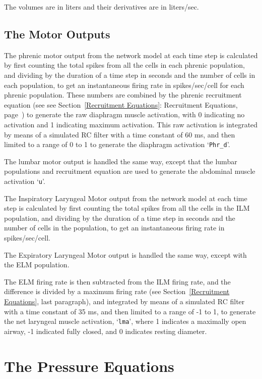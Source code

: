 \documentclass[12pt,openany,oneside]{book}
\newcommand{\tisamp}[1]{`\texttt{#1}'}
\newcommand{\tixref}[1]{see Section~\ref{#1}: #1, page~\pageref{#1}}
\begin{document}
The volumes are in liters and their derivatives are in liters/sec.

\subsection{The Motor Outputs}

\label{Phrd}
The phrenic motor output from the network model at each time step is
calculated by first counting the total spikes from all the cells in
each phrenic population, and dividing by the duration of a time step
in seconds and the number of cells in each population, to get an
instantaneous firing rate in spikes/sec/cell for each phrenic
population. These numbers are combined by the phrenic recruitment
equation (see \tixref{Recruitment Equations}) to generate the raw
diaphragm muscle activation, with 0 indicating no activation and 1
indicating maximum activation. This raw activation is integrated by
means of a simulated RC filter with a time constant of 60 ms, and then
limited to a range of 0 to 1 to generate the diaphragm activation
\tisamp{Phr\_d}.

The lumbar motor output is handled the same way, except that the
lumbar populations and recruitment equation are used to generate the
abdominal muscle activation \tisamp{u}.

The Inspiratory Laryngeal Motor output from the network model at each
time step is calculated by first counting the total spikes from all
the cells in the ILM population, and dividing by the duration of
a time step in seconds and the number of cells in the population, to
get an instantaneous firing rate in spikes/sec/cell.

The Expiratory Laryngeal Motor output is handled the same way, except
with the ELM population.

The ELM firing rate is then subtracted from the ILM firing rate, and
the difference is divided by a maximum firing rate (see
Section~\ref{Recruitment Equations}, last paragraph), and integrated
by means of a simulated RC filter with a time constant of 35 ms, and
then limited to a range of -1 to 1, to generate the net laryngeal
muscle activation, \tisamp{lma}, where 1 indicates a maximally open
airway, -1 indicated fully closed, and 0 indicates resting diameter.

\section{The Pressure Equations}
\end{document}
